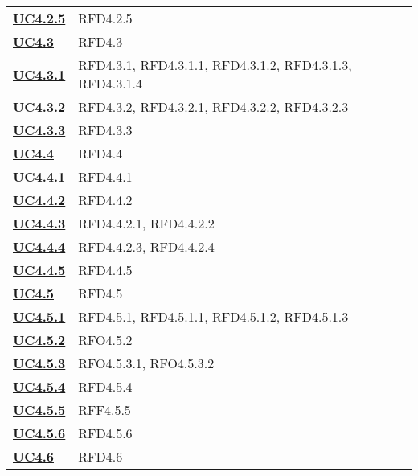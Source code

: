 \begin{longtable}[H]{| >{\centering\bfseries}p{8cm} | >{\centering\arraybackslash}p{8cm} |}
    \hyperref[par:uc4.2.5]{UC4.2.5} & RFD4.2.5 \\

    \hyperref[ssub:uc4.3]{UC4.3} & RFD4.3 \\

    \hyperref[par:uc4.3.1]{UC4.3.1} & RFD4.3.1, RFD4.3.1.1, RFD4.3.1.2, RFD4.3.1.3, RFD4.3.1.4 \\

    \hyperref[par:uc4.3.2]{UC4.3.2} & RFD4.3.2, RFD4.3.2.1, RFD4.3.2.2, RFD4.3.2.3 \\

    \hyperref[par:uc4.3.3]{UC4.3.3} & RFD4.3.3 \\


    \hyperref[ssub:uc4.4]{UC4.4} & RFD4.4 \\

    \hyperref[par:uc4.4.1]{UC4.4.1} & RFD4.4.1 \\

    \hyperref[par:uc4.4.2]{UC4.4.2} & RFD4.4.2 \\

    \hyperref[par:uc4.4.3]{UC4.4.3}  & RFD4.4.2.1, RFD4.4.2.2 \\

    \hyperref[par:uc4.4.4]{UC4.4.4} & RFD4.4.2.3, RFD4.4.2.4 \\

    \hyperref[par:uc4.4.5]{UC4.4.5} & RFD4.4.5 \\




    \hyperref[ssub:uc4.5]{UC4.5} & RFD4.5 \\

    \hyperref[par:uc4.5.1]{UC4.5.1}  & RFD4.5.1, RFD4.5.1.1, RFD4.5.1.2, RFD4.5.1.3 \\

    \hyperref[par:uc4.5.2]{UC4.5.2} & RFO4.5.2\\

    \hyperref[par:uc4.5.3]{UC4.5.3} & RFO4.5.3.1, RFO4.5.3.2 \\

    \hyperref[par:uc4.5.4]{UC4.5.4} & RFD4.5.4 \\

    \hyperref[par:uc4.5.5]{UC4.5.5} & RFF4.5.5 \\

    \hyperref[par:uc4.5.6]{UC4.5.6} & RFD4.5.6 \\

    \hyperref[ssub:uc4.6]{UC4.6} & RFD4.6 \\


\end{longtable}
